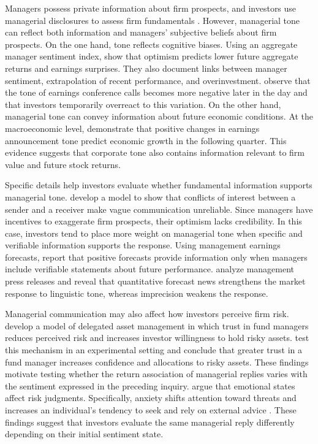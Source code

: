 Managers possess private information about firm prospects, and investors use managerial disclosures to assess firm fundamentals \citep{beyer2010financial,healy2001information}. However, managerial tone can reflect both information and managers' subjective beliefs about firm prospects. On the one hand, tone reflects cognitive biases. Using an aggregate manager sentiment index, \citet{jiang2019} show that optimism predicts lower future aggregate returns and earnings surprises. They also document links between manager sentiment, extrapolation of recent performance, and overinvestment. \citet{chen2018morning} observe that the tone of earnings conference calls becomes more negative later in the day and that investors temporarily overreact to this variation. On the other hand, managerial tone can convey information about future economic conditions. At the macroeconomic level, \citet{demers2024aggregate} demonstrate that positive changes in earnings announcement tone predict economic growth in the following quarter. This evidence suggests that corporate tone also contains information relevant to firm value and future stock returns.

Specific details help investors evaluate whether fundamental information supports managerial tone.  \citet{crawford1982} develop a model to show that conflicts of interest between a sender and a receiver make vague communication unreliable. Since managers have incentives to exaggerate firm prospects, their optimism lacks credibility. In this case, investors tend to place more weight on managerial tone when specific and verifiable information supports the response. Using management earnings forecasts, \citet{hutton2003} report that positive forecasts provide information only when managers include verifiable statements about future performance. \citet{baginski2016verification} analyze management press releases and reveal that quantitative forecast news strengthens the market response to linguistic tone, whereas imprecision weakens the response. 

Managerial communication may also affect how investors perceive firm risk. \citet{gennaioli2015} develop a model of delegated asset management in which trust in fund managers reduces perceived risk and increases investor willingness to hold risky assets. \citet{germann2025trust} test this mechanism in an experimental setting and conclude that greater trust in a fund manager increases confidence and allocations to risky assets. These findings motivate testing whether the return association of managerial replies varies with the sentiment expressed in the preceding inquiry. \citet{loewenstein2001risk} argue that emotional states affect risk judgments. Specifically, anxiety shifts attention toward threats and increases an individual's tendency to seek and rely on external advice \citep{eysenck2007anxiety,gino2012}. These findings suggest that investors evaluate the same managerial reply differently depending on their initial sentiment state.

